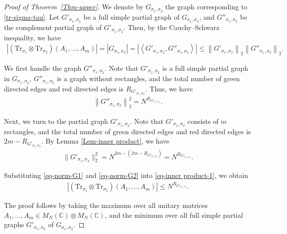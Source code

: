\documentclass[10pt,a4paper]{amsart}
\numberwithin{equation}{section}
\theoremstyle{plain}
\def\bC{\mathbb C}
\def\Tr{\mathrm {Tr}}
\begin{document}
\begin{proof}[Proof of Theorem~\ref{Thm-upper}]
We denote by $G_{\sigma_1,\sigma_2}$ the graph corresponding to \eqref{tr-sigma-tau}. Let $G'_{\sigma_1,\sigma_2}$ be a full simple partial graph of $G_{\sigma_1,\sigma_2}$, and $G''_{\sigma_1,\sigma_2}$ be the complement partial graph of $G'_{\sigma_1,\sigma_2}$. Then, by the Cauchy--Schwarz inequality, we have
\begin{align} \label{eq-inner product-1}
    \left| \left( \Tr_{\sigma_1} \otimes \Tr_{\sigma_2} \right) \left( A_1, \ldots, A_m \right) \right|
    = | G_{\sigma_1,\sigma_2} |
    = \left| \left\langle G'_{\sigma_1,\sigma_2}, G''_{\sigma_1,\sigma_2} \right\rangle \right|
    \le \left\|G'_{\sigma_1,\sigma_2} \right\|_2 \left\| G''_{\sigma_1,\sigma_2} \right\|_2.
\end{align}

We first handle the graph $G''_{\sigma_1,\sigma_2}$. Note that $G'_{\sigma_1,\sigma_2}$ is a full simple partial graph in $G_{\sigma_1,\sigma_2}$, $G''_{\sigma_1,\sigma_2}$ is a graph without rectangles, and the total number of green directed edges and red directed edges is $R_{G'_{\sigma_1,\sigma_2}}$. Thus, we have
\begin{align}\label{eq-norm-G2}
    \left\| G''_{\sigma_1,\sigma_2} \right\|_2^2 = N^{R_{G'_{\sigma_1,\sigma_2}}}.
\end{align}

Next, we turn to the partial graph $G'_{\sigma_1,\sigma_2}$. Note that $G'_{\sigma_1,\sigma_2}$ consists of $m$ rectangles, and the total number of green directed edges and red directed edges is $2m-R_{G'_{\sigma_1,\sigma_2}}$. By Lemma \ref{Lem-inner product}, we have
\begin{align}\label{eq-norm-G1}
    \|G'_{\sigma_1,\sigma_2}\|_2^2
    = N^{2m - \left( 2m-R_{G'_{\sigma_1,\sigma_2}} \right)}
    = N^{R_{G'_{\sigma_1,\sigma_2}}}.
\end{align}

Substituting \eqref{eq-norm-G1} and \eqref{eq-norm-G2} into \eqref{eq-inner product-1}, we obtain
\begin{align*}
    \left| \left( \Tr_{\sigma_1} \otimes \Tr_{\sigma_2} \right) \left( A_1, \ldots, A_m \right) \right|
    \le N^{R_{G'_{\sigma_1,\sigma_2}}}.
\end{align*}

The proof follows by taking the maximum over all unitary matrices $A_1,\ldots,A_m \in M_N (\bC) \otimes M_N(\bC)$, and the minimum over all full simple partial graphs $G'_{\sigma_1,\sigma_2}$ of $G_{\sigma_1,\sigma_2}$.
\end{proof}
\end{document}
